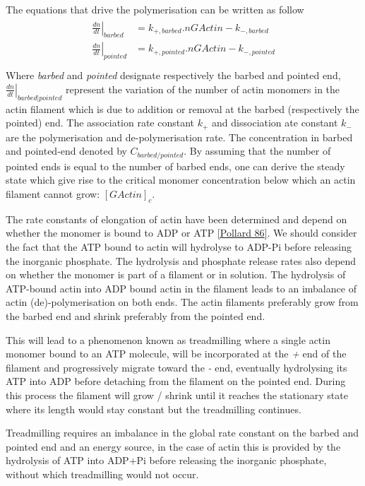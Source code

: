 \documentclass[A4paperpaper,11pt,english]{sphinxmanual}
\begin{document}
The equations that drive the polymerisation can be written as follow
\label{parts/part1:equation-roa1}\begin{gather}
\begin{split}\left. \frac{dn}{dt} \right|_{barbed}&= k_{+,{barbed}}.nGActin - k_{-,{barbed}} \\
\left. \frac{dn}{dt}\right|_{pointed}&= k_{+,{pointed}}.nGActin - k_{-,{pointed}} \\\end{split}\label{parts/part1-roa1}
\end{gather}
Where \emph{barbed} and \emph{pointed} designate respectively the barbed and pointed end,
\(\left.\frac{dn}{dt} \right|_{barbed|pointed}\) represent the variation of the number of actin
monomers in the actin filament which is due to addition or removal at the barbed
(respectively the pointed) end.
The association rate constant \(k_+\) and dissociation ate constant \(k_-\) are the polymerisation and de-polymerisation
rate.  The concentration in barbed and pointed-end denoted by
\(C_{{barbed}/{pointed}}\). By assuming that the number of pointed ends is
equal to the number of barbed ends, one can derive the steady state which give
rise to the critical monomer concentration below which an actin filament cannot
grow: \([GActin]_c\).

The rate constants of elongation of actin have been determined and depend on
whether the monomer is bound to ADP or ATP {\hyperref[parts/part1:pollard1986]{{[}Pollard 86{]}}}. We should
consider the fact that the  ATP bound to actin will hydrolyse to ADP-Pi before releasing
the inorganic phosphate. The hydrolysis and phosphate release rates also depend on whether the
monomer is part of a filament or in solution. The hydrolysis of ATP-bound
actin into ADP bound actin in the filament  leads to an imbalance of actin
(de)-polymerisation on both ends. The actin filaments preferably
grow from the barbed end and shrink preferably from the pointed end.

This will lead to a phenomenon known as treadmilling where a single actin
monomer bound to an ATP molecule, will be incorporated at the \emph{+} end of the
filament and progressively migrate toward the \emph{-} end, eventually hydrolysing its
ATP into ADP before detaching from the filament on the pointed end. During this
process the filament will grow / shrink until it reaches the stationary state
where its length would stay constant but the treadmilling continues.

Treadmilling requires an imbalance in the global rate constant on the barbed and
pointed end and an energy source, in the case of actin this is provided by the
hydrolysis of ATP into ADP+Pi before releasing the inorganic phosphate, without
which treadmilling would not occur.
\end{document}
